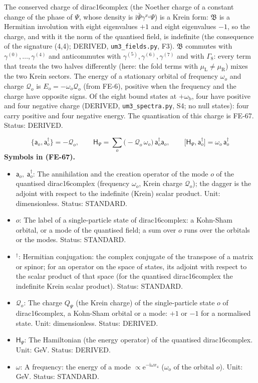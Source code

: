 \documentclass[
  10pt,
]{article}
\providecommand{\tightlist}{%
  \setlength{\itemsep}{0pt}\setlength{\parskip}{0pt}}
\begin{document}
The conserved charge of dirac16complex (the Noether charge of a constant
change of the phase of \(\Psi\), whose density is
\(\mathrm{i}\bar\Psi\gamma^{x_4}\Psi\)) is a Krein form:
\(\mathfrak{B}\) is a Hermitian involution with eight eigenvalues \(+1\)
and eight eigenvalues \(-1\), so the charge, and with it the norm of the
quantised field, is indefinite (the consequence of the signature (4,4);
DERIVED, \texttt{um3\_fields.py}, F3). \(\mathfrak{B}\) commutes with
\(\gamma^{(0)}, \dots, \gamma^{(4)}\) and anticommutes with
\(\gamma^{(5)}, \gamma^{(6)}, \gamma^{(7)}\) and with \(\Gamma_8\):
every term that treats the two halves differently (here: the fold terms
with \(\mu_{\mathrm{L}} \ne \mu_{\mathrm{R}}\)) mixes the two Krein
sectors. The energy of a stationary orbital of frequency \(\omega_o\)
and charge \(\mathcal{Q}_o\) is \(E_o = -\omega_o\mathcal{Q}_o\) (from
FE-6), positive when the frequency and the charge have opposite signs.
Of the eight bound states at \(+\omega_{\mathrm{b}}\), four have
positive and four negative charge (DERIVED, \texttt{um3\_spectra.py},
S4; no null states): four carry positive and four negative energy. The
quantisation of this charge is FE-67. Status: DERIVED.

\[
\big\{\mathsf{a}_o, \mathsf{a}_o^\dagger\big\} = -\mathcal{Q}_o,\qquad
\mathsf{H}_\Psi = \sum_o\big(-\mathcal{Q}_o\,\omega_o\big)\,\mathsf{a}_o^\dagger\mathsf{a}_o,\qquad
\big[\mathsf{H}_\Psi, \mathsf{a}_o^\dagger\big] = \omega_o\,\mathsf{a}_o^\dagger \tag{FE-67}
\] \textbf{Symbols in (FE-67).}

\begin{itemize}
\tightlist
\item
  \(\mathsf{a}_o,\ \mathsf{a}_o^\dagger\): The annihilation and the
  creation operator of the mode \(o\) of the quantised dirac16complex
  (frequency \(\omega_o\), Krein charge \(\mathcal{Q}_o\)); the dagger
  is the adjoint with respect to the indefinite (Krein) scalar product.
  Unit: dimensionless. Status: STANDARD.
\item
  \(o\): The label of a single-particle state of dirac16complex: a
  Kohn-Sham orbital, or a mode of the quantised field; a sum over \(o\)
  runs over the orbitals or the modes. Status: STANDARD.
\item
  \({}^\dagger\): Hermitian conjugation: the complex conjugate of the
  transpose of a matrix or spinor; for an operator on the space of
  states, its adjoint with respect to the scalar product of that space
  (for the quantised dirac16complex the indefinite Krein scalar
  product). Status: STANDARD.
\item
  \(\mathcal{Q}_o\): The charge \(Q_\Psi\) (the Krein charge) of the
  single-particle state \(o\) of dirac16complex, a Kohn-Sham orbital or
  a mode: \(+1\) or \(-1\) for a normalised state. Unit: dimensionless.
  Status: DERIVED.
\item
  \(\mathsf{H}_\Psi\): The Hamiltonian (the energy operator) of the
  quantised dirac16complex. Unit: GeV. Status: DERIVED.
\item
  \(\omega\): A frequency: the energy of a mode
  \(\propto \mathrm{e}^{-\mathrm{i}\omega x_4}\) (\(\omega_o\) of the
  orbital \(o\)). Unit: GeV. Status: STANDARD.
\end{itemize}
\end{document}
